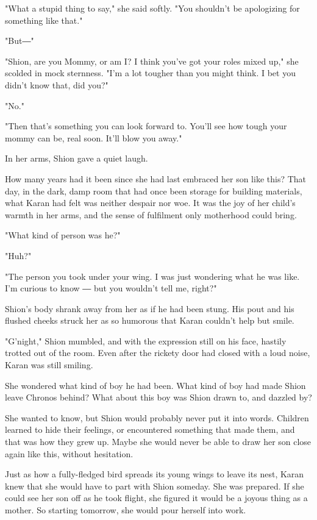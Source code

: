 "What a stupid thing to say," she said softly. "You shouldn't be
apologizing for something like that."

"But―"

"Shion, are you Mommy, or am I? I think you've got your roles mixed up,"
she scolded in mock sternness. "I'm a lot tougher than you might think.
I bet you didn't know that, did you?"

"No."

"Then that's something you can look forward to. You'll see how tough
your mommy can be, real soon. It'll blow you away."

In her arms, Shion gave a quiet laugh.

How many years had it been since she had last embraced her son like
this? That day, in the dark, damp room that had once been storage for
building materials, what Karan had felt was neither despair nor woe. It
was the joy of her child's warmth in her arms, and the sense of
fulfilment only motherhood could bring.

"What kind of person was he?"

"Huh?"

"The person you took under your wing. I was just wondering what he was
like. I'm curious to know ― but you wouldn't tell me, right?"

Shion's body shrank away from her as if he had been stung. His pout and
his flushed cheeks struck her as so humorous that Karan couldn't help
but smile.

"G'night," Shion mumbled, and with the expression still on his face,
hastily trotted out of the room. Even after the rickety door had closed
with a loud noise, Karan was still smiling.

She wondered what kind of boy he had been. What kind of boy had made
Shion leave Chronos behind? What about this boy was Shion drawn to, and
dazzled by?

She wanted to know, but Shion would probably never put it into words.
Children learned to hide their feelings, or encountered something that
made them, and that was how they grew up. Maybe she would never be able
to draw her son close again like this, without hesitation.

Just as how a fully-fledged bird spreads its young wings to leave its
nest, Karan knew that she would have to part with Shion someday. She was
prepared. If she could see her son off as he took flight, she figured it
would be a joyous thing as a mother. So starting tomorrow, she would
pour herself into work.

